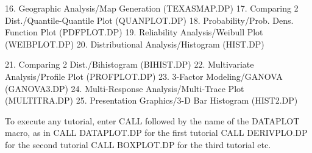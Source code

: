   16. Geographic Analysis/Map Generation (TEXASMAP.DP)
  17. Comparing 2 Dist./Quantile-Quantile Plot (QUANPLOT.DP)
  18. Probability/Prob. Dens. Function Plot (PDFPLOT.DP)
  19. Reliability Analysis/Weibull Plot (WEIBPLOT.DP)
  20. Distributional Analysis/Histogram (HIST.DP)
 
  21. Comparing 2 Dist./Bihistogram (BIHIST.DP)
  22. Multivariate Analysis/Profile Plot (PROFPLOT.DP)
  23. 3-Factor Modeling/GANOVA (GANOVA3.DP)
  24. Multi-Response Analysis/Multi-Trace Plot (MULTITRA.DP)
  25. Presentation Graphics/3-D Bar Histogram (HIST2.DP)
 
To execute any tutorial, enter CALL followed by the name
of the DATAPLOT macro, as in
      CALL DATAPLOT.DP    for the first tutorial
      CALL DERIVPLO.DP    for the second tutorial
      CALL BOXPLOT.DP     for the third tutorial
                          etc.
